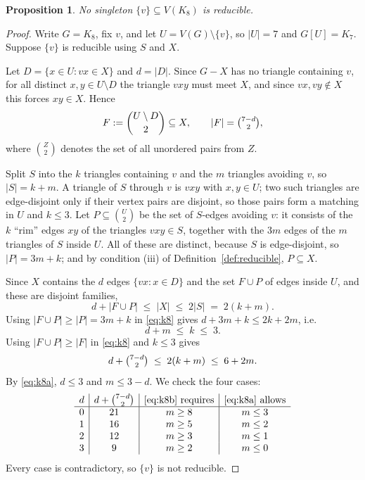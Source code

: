 \documentclass[11pt,a4paper]{amsart}
\theoremstyle{plain}
\newtheorem{proposition}[theorem]{Proposition}
\theoremstyle{definition}
\begin{document}
\begin{proposition}\label{prop:k8}
No singleton $\{v\}\subseteq V(K_8)$ is reducible.
\end{proposition}

\begin{proof}
Write $G=K_8$, fix $v$, and let $U=V(G)\setminus\{v\}$, so $|U|=7$ and
$G[U]=K_7$. Suppose $\{v\}$ is reducible using $S$ and $X$.

Let $D=\{x\in U : vx\in X\}$ and $d=|D|$. Since $G-X$ has no triangle
containing $v$, for all distinct $x,y\in U\setminus D$ the triangle $vxy$
must meet $X$, and since $vx,vy\notin X$ this forces $xy\in X$. Hence
\[
  F:=\binom{U\setminus D}{2}\subseteq X,\qquad |F|=\tbinom{7-d}{2},
\]
where $\binom{Z}{2}$ denotes the set of all unordered pairs from $Z$.

Split $S$ into the $k$ triangles containing $v$ and the $m$ triangles avoiding
$v$, so $|S|=k+m$. A triangle of $S$ through $v$ is $vxy$ with $x,y\in U$; two
such triangles are edge-disjoint only if their vertex pairs are disjoint, so
those pairs form a matching in $U$ and $k\le3$. Let $P\subseteq\binom{U}{2}$
be the set of $S$-edges avoiding $v$: it consists of the $k$ ``rim'' edges
$xy$ of the triangles $vxy\in S$, together with the $3m$ edges of the $m$
triangles of $S$ inside $U$. All of these are distinct, because $S$ is
edge-disjoint, so $|P|=3m+k$; and by condition (iii) of
Definition~\ref{def:reducible}, $P\subseteq X$.

Since $X$ contains the $d$ edges $\{vx : x\in D\}$ and the set $F\cup P$ of
edges inside $U$, and these are disjoint families,
\begin{equation}\label{eq:k8}
  d+|F\cup P|\;\le\;|X|\;\le\;2|S|\;=\;2(k+m).
\end{equation}
Using $|F\cup P|\ge|P|=3m+k$ in \eqref{eq:k8} gives $d+3m+k\le 2k+2m$, i.e.
\begin{equation}\label{eq:k8a}
  d+m\;\le\;k\;\le\;3 .
\end{equation}
Using $|F\cup P|\ge|F|$ in \eqref{eq:k8} and $k\le3$ gives
\begin{equation}\label{eq:k8b}
  d+\tbinom{7-d}{2}\;\le\;2(k+m)\;\le\;6+2m .
\end{equation}
By \eqref{eq:k8a}, $d\le3$ and $m\le3-d$. We check the four cases:
\[
\begin{array}{c|c|c|c}
 d & d+\binom{7-d}{2} & \text{\eqref{eq:k8b} requires} & \text{\eqref{eq:k8a} allows}\\
\hline
 0 & 21 & m\ge 8 & m\le 3\\
 1 & 16 & m\ge 5 & m\le 2\\
 2 & 12 & m\ge 3 & m\le 1\\
 3 &  9 & m\ge 2 & m\le 0\\
\end{array}
\]
Every case is contradictory, so $\{v\}$ is not reducible.
\end{proof}
\end{document}
